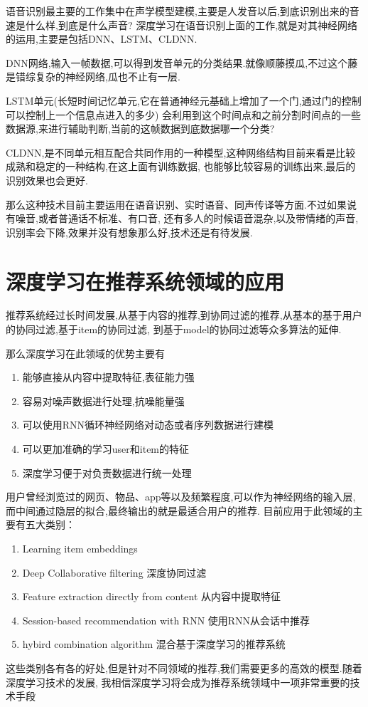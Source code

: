 \documentclass[UTF8]{ctexbook}
\begin{document}
语音识别最主要的工作集中在声学模型建模,主要是人发音以后,到底识别出来的音速是什么样,到底是什么声音?
深度学习在语音识别上面的工作,就是对其神经网络的运用,主要是包括DNN、LSTM、CLDNN.

DNN网络,输入一帧数据,可以得到发音单元的分类结果.就像顺藤摸瓜,不过这个藤是错综复杂的神经网络,瓜也不止有一层.

LSTM单元(长短时间记忆单元,它在普通神经元基础上增加了一个门,通过门的控制可以控制上一个信息点进入的多少)
会利用到这个时间点和之前分割时间点的一些数据源,来进行辅助判断,当前的这帧数据到底数据哪一个分类?

CLDNN,是不同单元相互配合共同作用的一种模型,这种网络结构目前来看是比较成熟和稳定的一种结构,在这上面有训练数据,
也能够比较容易的训练出来,最后的识别效果也会更好.

那么这种技术目前主要运用在语音识别、实时语音、同声传译等方面.不过如果说有噪音,或者普通话不标准、有口音,
还有多人的时候语音混杂,以及带情绪的声音,识别率会下降,效果并没有想象那么好,技术还是有待发展.

\section{深度学习在推荐系统领域的应用}
推荐系统经过长时间发展,从基于内容的推荐,到协同过滤的推荐,从基本的基于用户的协同过滤,基于item的协同过滤,
到基于model的协同过滤等众多算法的延伸.

那么深度学习在此领域的优势主要有
\begin{enumerate}
    \item 能够直接从内容中提取特征,表征能力强
    \item 容易对噪声数据进行处理,抗噪能量强
    \item 可以使用RNN循环神经网络对动态或者序列数据进行建模
    \item 可以更加准确的学习user和item的特征
    \item 深度学习便于对负责数据进行统一处理
\end{enumerate}
用户曾经浏览过的网页、物品、app等以及频繁程度,可以作为神经网络的输入层,而中间通过隐层的拟合,最终输出的就是最适合用户的推荐.
目前应用于此领域的主要有五大类别：
\begin{enumerate}
    \item Learning item embeddings
    \item Deep Collaborative filtering 深度协同过滤
    \item Feature extraction directly from content 从内容中提取特征
    \item Session-based recommendation with RNN 使用RNN从会话中推荐
    \item hybird combination algorithm 混合基于深度学习的推荐系统
\end{enumerate}
这些类别各有各的好处,但是针对不同领域的推荐,我们需要更多的高效的模型.随着深度学习技术的发展,
我相信深度学习将会成为推荐系统领域中一项非常重要的技术手段
\let\cleardoublepage\clearpage
\end{document}
